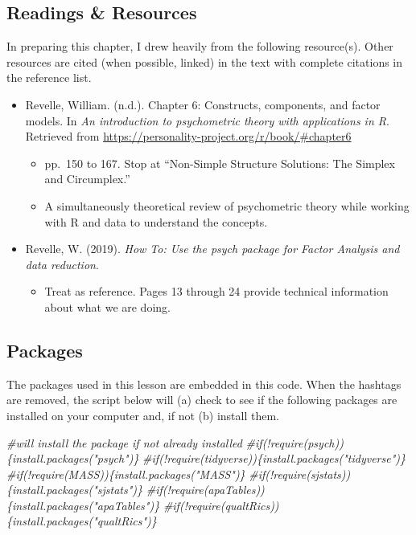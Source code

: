 \documentclass[
  english,
]{book}
\newenvironment{Shaded}{\begin{snugshade}}{\end{snugshade}}
\newcommand{\CommentTok}[1]{\textcolor[rgb]{0.56,0.35,0.01}{\textit{#1}}}
\providecommand{\tightlist}{%
  \setlength{\itemsep}{0pt}\setlength{\parskip}{0pt}}
\begin{document}
\hypertarget{readings-resources-7}{%
\subsection{Readings \& Resources}\label{readings-resources-7}}

In preparing this chapter, I drew heavily from the following resource(s). Other resources are cited (when possible, linked) in the text with complete citations in the reference list.

\begin{itemize}
\tightlist
\item
  Revelle, William. (n.d.). Chapter 6: Constructs, components, and factor models. In \emph{An introduction to psychometric theory with applications in R}. Retrieved from \url{https://personality-project.org/r/book/\#chapter6}

  \begin{itemize}
  \tightlist
  \item
    pp.~150 to 167. Stop at ``Non-Simple Structure Solutions: The Simplex and Circumplex.''
  \item
    A simultaneously theoretical review of psychometric theory while working with R and data to understand the concepts.
  \end{itemize}
\item
  Revelle, W. (2019). \emph{How To: Use the psych package for Factor Analysis and data reduction}.

  \begin{itemize}
  \tightlist
  \item
    Treat as reference. Pages 13 through 24 provide technical information about what we are doing.
  \end{itemize}
\end{itemize}

\hypertarget{packages-7}{%
\subsection{Packages}\label{packages-7}}

The packages used in this lesson are embedded in this code. When the hashtags are removed, the script below will (a) check to see if the following packages are installed on your computer and, if not (b) install them.

\begin{Shaded}
\begin{Highlighting}[]
\CommentTok{#will install the package if not already installed}
\CommentTok{#if(!require(psych))\{install.packages("psych")\}}
\CommentTok{#if(!require(tidyverse))\{install.packages("tidyverse")\}}
\CommentTok{#if(!require(MASS))\{install.packages("MASS")\}}
\CommentTok{#if(!require(sjstats))\{install.packages("sjstats")\}}
\CommentTok{#if(!require(apaTables))\{install.packages("apaTables")\}}
\CommentTok{#if(!require(qualtRics))\{install.packages("qualtRics")\}}
\end{Highlighting}
\end{Shaded}
\end{document}
